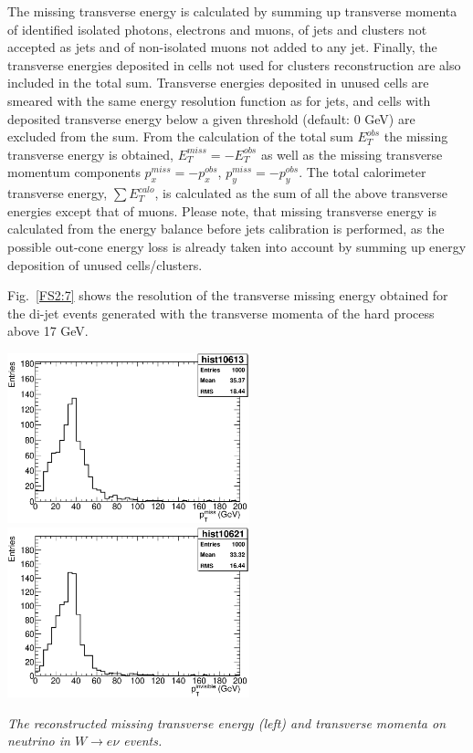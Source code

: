 The missing transverse energy is calculated by summing up transverse
momenta of identified isolated photons, electrons and muons, of jets
and clusters not accepted as jets and of
non-isolated muons not added to any jet. Finally, the
transverse energies deposited in cells not used for clusters
reconstruction are also included in the total sum. Transverse energies
deposited in unused cells are smeared with the same energy resolution
function as for jets, and cells with deposited transverse energy below
a given threshold (default: 0 GeV) are excluded from the sum. From
the calculation of the total sum $E_T^{obs}$ the missing transverse
energy is obtained, $E_T^{miss} = - E_T^{obs}$ as well as the missing
transverse momentum components $p_x^{miss} = - p_x^{obs}$, 
$p_y^{miss} = - p_y^{obs}$. The total calorimeter transverse energy,
$\sum E_T^{calo}$, is calculated as the sum of all the above
transverse energies except that of muons.
Please note, that missing transverse energy is calculated from the
energy balance before jets calibration is performed, as the possible 
out-cone energy loss is already taken into account by summing up energy
deposition of unused cells/clusters.

Fig.~\ref{FS2:7} shows the resolution of the transverse missing energy
obtained for the di-jet events generated with the transverse momenta
of the hard process above 17 GeV.

\begin{Fighere}
\begin{center}
{
   \includegraphics[width=7.0cm,angle=0]{plot-recoPTMiss.eps}
   \includegraphics[width=7.0cm,angle=0]{plot-truthPTinvis.eps}\\
}
\end{center}
\caption{\em
The reconstructed missing transverse energy (left) and transverse momenta on neutrino
in $W \to e \nu$ events.
\label{FS2:7}} 
\end{Fighere}



